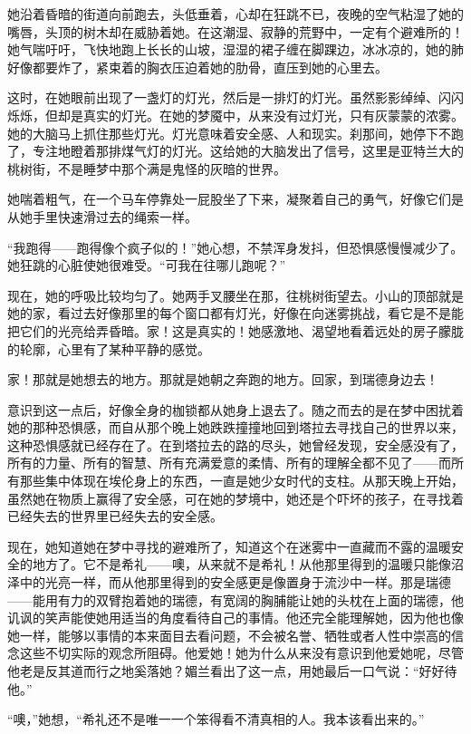 \par 她沿着昏暗的街道向前跑去，头低垂着，心却在狂跳不已，夜晚的空气粘湿了她的嘴唇，头顶的树木却在威胁着她。在这潮湿、寂静的荒野中，一定有个避难所的！她气喘吁吁，飞快地跑上长长的山坡，湿湿的裙子缠在脚踝边，冰冰凉的，她的肺好像都要炸了，紧束着的胸衣压迫着她的肋骨，直压到她的心里去。
\par 这时，在她眼前出现了一盏灯的灯光，然后是一排灯的灯光。虽然影影绰绰、闪闪烁烁，但却是真实的灯光。在她的梦魇中，从来没有过灯光，只有灰蒙蒙的浓雾。她的大脑马上抓住那些灯光。灯光意味着安全感、人和现实。刹那间，她停下不跑了，专注地瞪着那排煤气灯的灯光。这给她的大脑发出了信号，这里是亚特兰大的桃树街，不是睡梦中那个满是鬼怪的灰暗的世界。
\par 她喘着粗气，在一个马车停靠处一屁股坐了下来，凝聚着自己的勇气，好像它们是从她手里快速滑过去的绳索一样。
\par “我跑得——跑得像个疯子似的！”她心想，不禁浑身发抖，但恐惧感慢慢减少了。她狂跳的心脏使她很难受。“可我在往哪儿跑呢？”
\par 现在，她的呼吸比较均匀了。她两手叉腰坐在那，往桃树街望去。小山的顶部就是她的家，看过去好像那里的每个窗口都有灯光，好像在向迷雾挑战，看它是不是能把它们的光亮给弄昏暗。家！这是真实的！她感激地、渴望地看着远处的房子朦胧的轮廓，心里有了某种平静的感觉。
\par 家！那就是她想去的地方。那就是她朝之奔跑的地方。回家，到瑞德身边去！
\par 意识到这一点后，好像全身的枷锁都从她身上退去了。随之而去的是在梦中困扰着她的那种恐惧感，而自从那个晚上她跌跌撞撞地回到塔拉去寻找自己的世界以来，这种恐惧感就已经存在了。在到塔拉去的路的尽头，她曾经发现，安全感没有了，所有的力量、所有的智慧、所有充满爱意的柔情、所有的理解全都不见了——而所有那些集中体现在埃伦身上的东西，一直是她少女时代的支柱。从那天晚上开始，虽然她在物质上赢得了安全感，可在她的梦境中，她还是个吓坏的孩子，在寻找着已经失去的世界里已经失去的安全感。
\par 现在，她知道她在梦中寻找的避难所了，知道这个在迷雾中一直藏而不露的温暖安全的地方了。它不是希礼——噢，从来就不是希礼！从他那里得到的温暖只能像沼泽中的光亮一样，而从他那里得到的安全感更是像置身于流沙中一样。那是瑞德——能用有力的双臂抱着她的瑞德，有宽阔的胸脯能让她的头枕在上面的瑞德，他讥讽的笑声能使她用适当的角度看待自己的事情。他还完全能理解她，因为他也像她一样，能够以事情的本来面目去看问题，不会被名誉、牺牲或者人性中崇高的信念这些不切实际的观念所阻碍。他爱她！她为什么从来没有意识到他爱她呢，尽管他老是反其道而行之地奚落她？媚兰看出了这一点，用她最后一口气说：“好好待他。”
\par “噢，”她想，“希礼还不是唯一一个笨得看不清真相的人。我本该看出来的。”
